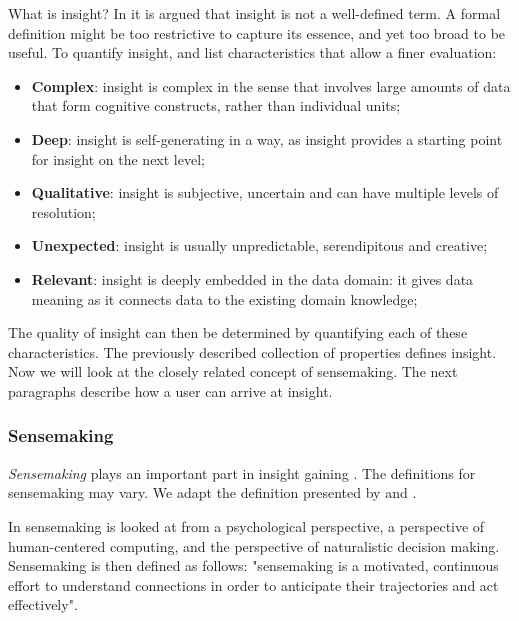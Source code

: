 What is insight? In \cite{north:2006} it is argued that insight is not a well-defined term. A formal definition might be too restrictive to capture its essence, and yet too broad to be useful. To quantify insight, \cite{north:2006} and \cite{yi:2008} list characteristics that allow a finer evaluation:

\begin{itemize}
	\item \textbf{Complex}: insight is complex in the sense that involves large amounts of data that form cognitive constructs, rather than individual units;
	\item \textbf{Deep}: insight is self-generating in a way, as insight provides a starting point for insight on the next level;
	\item \textbf{Qualitative}: insight is subjective, uncertain and can have multiple levels of resolution;
	\item \textbf{Unexpected}: insight is usually unpredictable, serendipitous and creative;
	\item \textbf{Relevant}: insight is deeply embedded in the data domain: it gives data meaning as it connects data to the existing domain knowledge;
\end{itemize}

The quality of insight can then be determined by quantifying each of these characteristics\cite{north:2006}. The previously described collection of properties defines insight. Now we will look at the closely related concept of sensemaking. The next paragraphs describe how a user can arrive at insight.


\subsubsection{Sensemaking}\label{chapter:literature_study:section:user:subsection:insight:subsubsection:sensemaking}

\emph{Sensemaking} plays an important part in insight gaining \cite{yi:2008}. The definitions for sensemaking may vary. We adapt the definition presented by \cite{Klein:2006:MSS:1158821.1159015} and \cite{yi:2008}.

In \cite{Klein:2006:MSS:1158821.1159015} sensemaking is looked at from a psychological perspective, a perspective of human-centered computing, and the perspective of naturalistic decision making. Sensemaking is then defined as follows: "sensemaking is a motivated, continuous effort to understand connections in order to anticipate their trajectories and act effectively"\cite{Klein:2006:MSS:1158821.1159015}.


